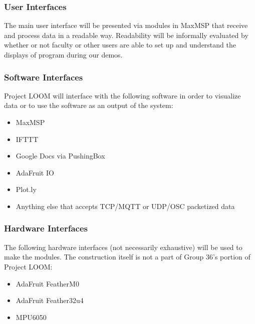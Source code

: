 \documentclass[onecolumn, draftclsnofoot,10pt, compsoc]{IEEEtran}
\begin{document}
		\subsubsection{User Interfaces}
		The main user interface will be presented via modules in MaxMSP that receive and process data in a readable way. Readability will be informally evaluated by whether or not faculty or other users are able to set up and understand the displays of program during our demos.
		
		\subsubsection{Software Interfaces}
		Project LOOM will interface with the following software in order to visualize data or to use the software as an output of the system:
			\begin{itemize}
				\item MaxMSP
				\item IFTTT
				\item Google Docs via PushingBox
				\item AdaFruit IO
				\item Plot.ly
				\item Anything else that accepts TCP/MQTT or UDP/OSC packetized data
			\end{itemize}
		
		\subsubsection{Hardware Interfaces}
		The following hardware interfaces (not necessarily exhaustive) will be used to make the modules. The construction itself is not a part of Group 36’s portion of Project LOOM:
		\begin{itemize}
			\item AdaFruit FeatherM0
			\item AdaFruit Feather32u4
			\item MPU6050
		\end{itemize}
		
\end{document}
